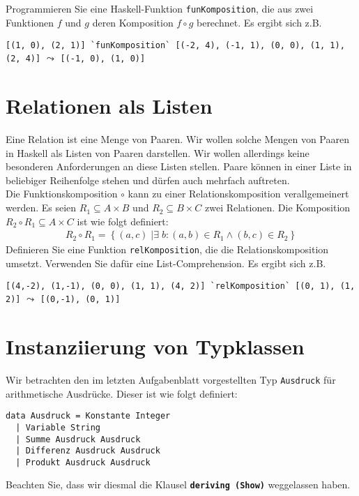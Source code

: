 \documentclass[
  10pt,                   %
  DIV12,
  german,                 %
  oneside,                %
  parskip=half,           %
  headings=normal,        %
  captions=tableheading,  %
]{scrartcl}
\begin{document}
\subsection{}
Programmieren Sie eine Haskell-Funktion \lstinline|funKomposition|, die aus zwei Funktionen
$f$ und $g$ deren Komposition $f \circ g$ berechnet. Es ergibt sich z.B.
\begin{center}
\lstinline|[(1, 0), (2, 1)] `funKomposition` [(-2, 4), (-1, 1), (0, 0), (1, 1), (2, 4)]| $\leadsto$ \lstinline|[(-1, 0), (1, 0)]|
\end{center}

\section{Relationen als Listen}
Eine Relation ist eine Menge von Paaren. Wir wollen solche Mengen von Paaren in Haskell
als Listen von Paaren darstellen. Wir wollen allerdings keine besonderen Anforderungen
an diese Listen stellen. Paare können in einer Liste in beliebiger Reihenfolge stehen und
dürfen auch mehrfach auftreten.\\	

Die Funktionskomposition $\circ$ kann zu einer Relationskomposition verallgemeinert werden.
Es seien $R_1 \subseteq A \times B$ und $R_2 \subseteq B \times C$ zwei Relationen. Die Komposition $R_2 \circ R_1 \subseteq A \times C$
ist wie folgt definiert:
\begin{align*}
R_2 \circ R_1 = \left\{(a, c)\;| \exists\;b : (a, b) \in R_1 \wedge (b, c) \in R_2 \right\}
\end{align*}
Definieren Sie eine Funktion \lstinline|relKomposition|, die die Relationskomposition umsetzt.
Verwenden Sie dafür eine List-Comprehension. Es ergibt sich z.B.
\begin{center}
\lstinline|[(4,-2), (1,-1), (0, 0), (1, 1), (4, 2)] `relKomposition` [(0, 1), (1, 2)]| $\leadsto$ \lstinline|[(0,-1), (0, 1)]|
\end{center}
\section{Instanziierung von Typklassen}
Wir betrachten den im letzten Aufgabenblatt vorgestellten Typ \lstinline|Ausdruck| für
arithmetische Ausdrücke. Dieser ist wie folgt definiert:
\begin{lstlisting}
data Ausdruck = Konstante Integer
  | Variable String
  | Summe Ausdruck Ausdruck
  | Differenz Ausdruck Ausdruck
  | Produkt Ausdruck Ausdruck
\end{lstlisting}
Beachten Sie, dass wir diesmal die Klausel \textbf{\lstinline|deriving (Show)|} weggelassen haben.
\end{document}
